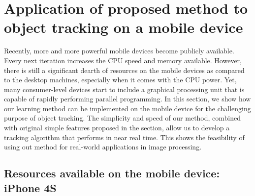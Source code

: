 \ifpdf
    \graphicspath{{4/figures/PNG/}{4/figures/PDF/}{4/figures/}}
\else
    \graphicspath{{4/figures/EPS/}{4/figures/}}
\fi
\chapter{Application of proposed method to object tracking on a mobile device} %

Recently, more and more powerful mobile devices become publicly available. Every next iteration increases the CPU speed and memory available. However, there is still a significant dearth of resources on the mobile devices as compared to the desktop machines, especially when it comes with the CPU power. Yet, many consumer-level devices start to include a graphical processing unit that is capable of rapidly performing parallel programming. In this section, we show how our learning method can be implemented on the mobile device for the challenging purpose of object tracking. The simplicity and speed of our method, combined with original simple features proposed in the section, allow us to develop a tracking algorithm that performs in near real time. This shows the feasibility of using out method for real-world applications in image processing.
\section{Resources available on the mobile device: iPhone 4S}
